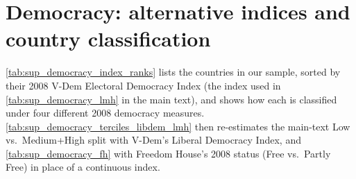 \documentclass[11pt]{article}
\let\mathbetasym\beta
\renewcommand{\beta}{\ensuremath{\mathbetasym}}
\begin{document}

\clearpage
\section{Democracy: alternative indices and country classification}\label{sup:democracy_alt}

\autoref{tab:sup_democracy_index_ranks} lists the countries in our sample, sorted by their 2008 V-Dem Electoral Democracy Index (the index used in \autoref{tab:sup_democracy_lmh} in the main text), and shows how each is classified under four different 2008 democracy measures. \autoref{tab:sup_democracy_terciles_libdem_lmh} then re-estimates the main-text Low vs.\ Medium+High split with V-Dem's Liberal Democracy Index, and \autoref{tab:sup_democracy_fh} with Freedom House's 2008 status (Free vs.\ Partly Free) in place of a continuous index. 
\end{document}
